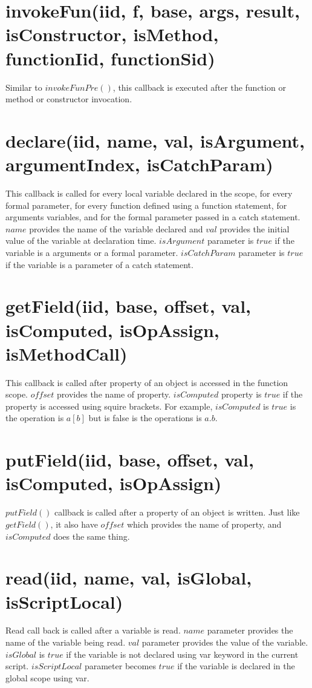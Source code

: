 \documentclass[accentcolor=tud0b,12pt,paper=a4]{tudreport}
\begin{document}
\section{invokeFun(iid, f, base, args, result, isConstructor, isMethod, functionIid, functionSid)}
Similar to $invokeFunPre()$, this callback is executed after the function or method or constructor invocation.
\section{declare(iid, name, val, isArgument, argumentIndex, isCatchParam)}
This callback is called for every local variable declared in the scope, for every formal parameter, for every function defined using a function statement, for arguments variables, and for the formal parameter passed in a catch statement. $name$ provides the name of the variable declared and $val$ provides the initial value of the variable at declaration time. $isArgument$ parameter is $true$ if the variable is a arguments
or a formal parameter. $isCatchParam$ parameter is $true$ if the variable is a parameter of a catch statement.
\section{getField(iid, base, offset, val, isComputed, isOpAssign, isMethodCall)}
This callback is called after property of an object is accessed in the function scope. $offset$ provides the name of property. $isComputed$ property is $true$ if the property is accessed using squire brackets. For example, $isComputed$ is $true$ is the operation is $a[b]$ but is false is the operations is $a.b$.
\section{putField(iid, base, offset, val, isComputed, isOpAssign)}
$putField()$ callback is called after a property of an object is written. Just like $getField()$, it also have $offset$ which provides the name of property, and $isComputed$ does the same thing.
\section{read(iid, name, val, isGlobal, isScriptLocal)}
Read call back is called after a variable is read. $name$ parameter provides the name of the variable being read. $val$ parameter provides the value of the variable. $isGlobal$ is $true$ if the variable is not declared using var keyword in the current script. $isScriptLocal$ parameter becomes $true$ if the variable is declared in the global
scope using var.
\end{document}
